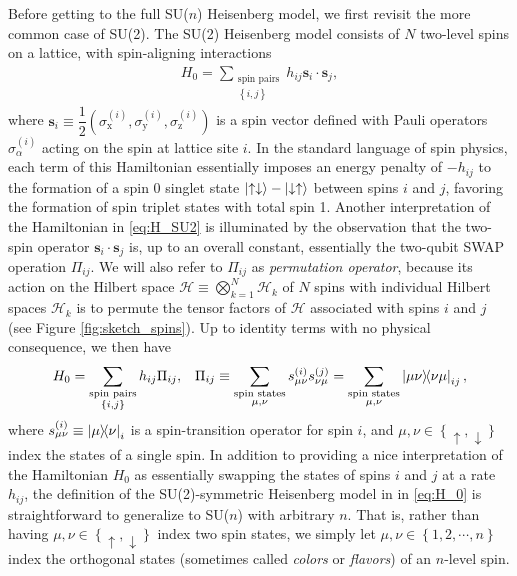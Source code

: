 \documentclass[nofootinbib,notitlepage,11pt]{revtex4-2}
\renewcommand{\t}{\text} %
\newcommand{\f}[2]{\dfrac{#1}{#2}} %
\newcommand{\p}[1]{\left(#1\right)} %
\renewcommand{\set}[1]{\left\{#1\right\}} %
\renewcommand{\c}{\cdot} %
\newcommand{\m}{\bm} %
\newcommand{\1}{\mathds{1}}
\newcommand{\up}{\uparrow}
\newcommand{\dn}{\downarrow}
\newcommand{\x}{\text{x}}
\newcommand{\y}{\text{y}}
\newcommand{\z}{\text{z}}
\renewcommand{\H}{\mathcal{H}}
\begin{document}
Before getting to the full SU($n$) Heisenberg model, we first revisit
the more common case of SU(2).  The SU(2) Heisenberg model consists of
$N$ two-level spins on a lattice, with spin-aligning interactions
\begin{align}
  H_0 = \sum_{\substack{\t{spin pairs}\\\set{i,j}}}
  h_{ij} \m s_i \c\m s_j,
  \label{eq:H_SU2}
\end{align}
where
$\m s_i\equiv\f12\p{\sigma_\x^{(i)},\sigma_\y^{(i)},\sigma_\z^{(i)}}$
is a spin vector defined with Pauli operators $\sigma_\alpha^{(i)}$
acting on the spin at lattice site $i$.  In the standard language of
spin physics, each term of this Hamiltonian essentially imposes an
energy penalty of $-h_{ij}$ to the formation of a spin 0 singlet state
$\ket{\up\dn}-\ket{\dn\up}$ between spins $i$ and $j$, favoring the
formation of spin triplet states with total spin 1.  Another
interpretation of the Hamiltonian in \eqref{eq:H_SU2} is illuminated
by the observation that the two-spin operator $\m s_i\c\m s_j$ is, up
to an overall constant, essentially the two-qubit SWAP operation
$\Pi_{ij}$.  We will also refer to $\Pi_{ij}$ as {\it permutation
  operator}, because its action on the Hilbert space
$\H\equiv\bigotimes_{k=1}^N\H_k$ of $N$ spins with individual Hilbert
spaces $\H_k$ is to permute the tensor factors of $\H$ associated with
spins $i$ and $j$ (see Figure \ref{fig:sketch_spins}).  Up to identity
terms with no physical consequence, we then have
\begin{align}
  H_0 = \sum_{\substack{\t{spin pairs}\\\set{i,j}}} h_{ij} \Pi_{ij},
  &&
  \Pi_{ij} \equiv \sum_{\substack{\t{spin states}\\\mu,\nu}}
  s_{\mu\nu}^{(i)} s_{\nu\mu}^{(j)}
  = \sum_{\substack{\t{spin states}\\\mu,\nu}} \op{\mu\nu}{\nu\mu}_{ij},
  \label{eq:H_0}
\end{align}
where $s_{\mu\nu}^{(i)}\equiv\op{\mu}{\nu}_i$ is a spin-transition
operator for spin $i$, and $\mu,\nu\in\set{\up,\dn}$ index the states
of a single spin.  In addition to providing a nice interpretation of
the Hamiltonian $H_0$ as essentially swapping the states of spins $i$
and $j$ at a rate $h_{ij}$, the definition of the SU(2)-symmetric
Heisenberg model in in \eqref{eq:H_0} is straightforward to generalize
to SU($n$) with arbitrary $n$.  That is, rather than having
$\mu,\nu\in\set{\up,\dn}$ index two spin states, we simply let
$\mu,\nu\in\set{1,2,\cdots,n}$ index the orthogonal states (sometimes
called {\it colors} or {\it flavors}) of an $n$-level spin.
\end{document}
